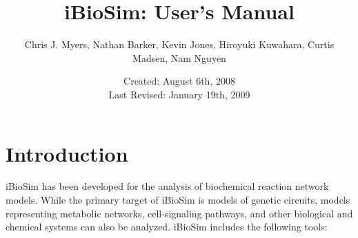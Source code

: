 \documentclass[titlepage,11pt]{article}
\title{iBioSim: User's Manual}
\author{Chris J. Myers, Nathan Barker, Kevin Jones, Hiroyuki Kuwahara, Curtis
  Madsen, Nam Nguyen}
\date{Created: August 6th, 2008\\
  Last Revised: January 19th, 2009
}
\begin{document}
\maketitle

  
\tableofcontents

\clearpage
  

\section{Introduction}

\noindent
iBioSim has been developed for the analysis of biochemical
reaction network models.  While the primary target of iBioSim is
models of genetic circuits, models representing metabolic
networks, cell-signaling pathways, and other biological and
chemical systems can also be analyzed.  iBioSim includes the
following tools: 
\end{document}

